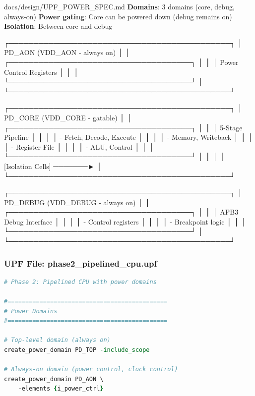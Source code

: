 \begin{relocated}{docs/design/UPF_POWER_SPEC.md}
\textbf{Domains}: 3 domains (core, debug, always-on) \textbf{Power
gating}: Core can be powered down (debug remains on) \textbf{Isolation}:
Between core and debug

\begin{textblock}
┌─────────────────────────────────────────────┐
│         PD_AON (VDD_AON - always on)        │
│  ┌─────────────────────────────────────┐   │
│  │  Power Control Registers            │   │
│  └─────────────────────────────────────┘   │
└─────────────────────────────────────────────┘

┌─────────────────────────────────────────────┐
│         PD_CORE (VDD_CORE - gatable)        │
│  ┌─────────────────────────────────────┐   │
│  │  5-Stage Pipeline                   │   │
│  │  - Fetch, Decode, Execute           │   │
│  │  - Memory, Writeback                │   │
│  │  - Register File                    │   │
│  │  - ALU, Control                     │   │
│  └─────────────────────────────────────┘   │
│                                             │
│       [Isolation Cells] ───────►            │
└─────────────────────────────────────────────┘

┌─────────────────────────────────────────────┐
│      PD_DEBUG (VDD_DEBUG - always on)       │
│  ┌─────────────────────────────────────┐   │
│  │  APB3 Debug Interface               │   │
│  │  - Control registers                │   │
│  │  - Breakpoint logic                 │   │
│  └─────────────────────────────────────┘   │
└─────────────────────────────────────────────┘
\end{textblock}

\subsubsection{\texorpdfstring{UPF File:
phase2\_\allowbreak{}pipelined\_\allowbreak{}cpu.upf}{UPF File: phase2\_pipelined\_cpu.upf}}\label{ds:ch:upf-power-spec:upf-file-phase2-pipelined-cpuupf}

\begin{lstlisting}[language=tcl]
# Phase 2: Pipelined CPU with power domains

#=============================================
# Power Domains
#=============================================

# Top-level domain (always on)
create_power_domain PD_TOP -include_scope

# Always-on domain (power control, clock control)
create_power_domain PD_AON \
    -elements {i_power_ctrl}


\end{lstlisting}
\end{relocated}
